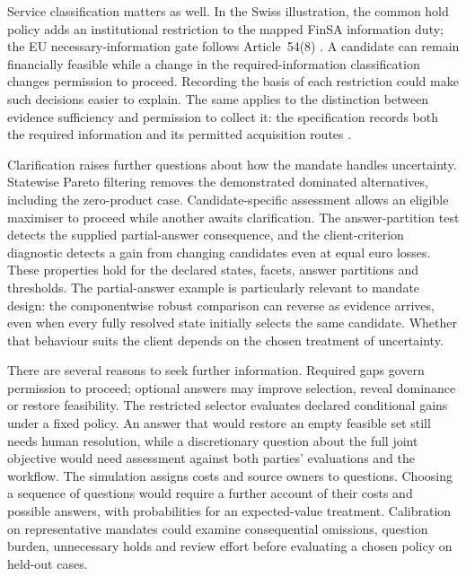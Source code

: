 \documentclass[oneside,10pt,english]{swissi}
\begin{document}
Service classification matters as well. In the Swiss illustration, the common hold policy adds an institutional restriction to the mapped FinSA information duty; the EU necessary-information gate follows Article~54(8) \parencites[arts.~11--14]{switzerland2018finsa}[art.~54(8)]{europeancommission2017suitability}. A candidate can remain financially feasible while a change in the required-information classification changes permission to proceed. Recording the basis of each restriction could make such decisions easier to explain. The same applies to the distinction between evidence sufficiency and permission to collect it: the specification records both the required information and its permitted acquisition routes \parencites{esma1762missinginfo}[arts.~5--6]{europeanunion2016gdpr}[arts.~6--7]{switzerland2020fadp}.

Clarification raises further questions about how the mandate handles uncertainty. Statewise Pareto filtering removes the demonstrated dominated alternatives, including the zero-product case. Candidate-specific assessment allows an eligible maximiser to proceed while another awaits clarification. The answer-partition test detects the supplied partial-answer consequence, and the client-criterion diagnostic detects a gain from changing candidates even at equal euro losses. These properties hold for the declared states, facets, answer partitions and thresholds. The partial-answer example is particularly relevant to mandate design: the componentwise robust comparison can reverse as evidence arrives, even when every fully resolved state initially selects the same candidate. Whether that behaviour suits the client depends on the chosen treatment of uncertainty.

There are several reasons to seek further information. Required gaps govern permission to proceed; optional answers may improve selection, reveal dominance or restore feasibility. The restricted selector evaluates declared conditional gains under a fixed policy. An answer that would restore an empty feasible set still needs human resolution, while a discretionary question about the full joint objective would need assessment against both parties' evaluations and the workflow. The simulation assigns costs and source owners to questions. Choosing a sequence of questions would require a further account of their costs and possible answers, with probabilities for an expected-value treatment. Calibration on representative mandates could examine consequential omissions, question burden, unnecessary holds and review effort before evaluating a chosen policy on held-out cases.
\end{document}
